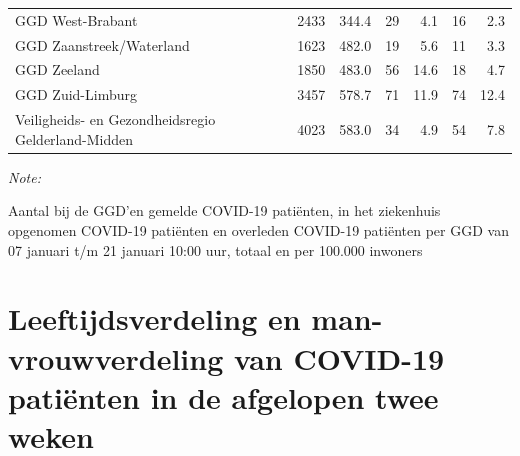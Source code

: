 \documentclass[
  english,
  man,floatsintext]{apa6}
\begin{document}
\begin{table}[H]
\begin{threeparttable}
\begin{tabular}{lrrrrrr}
GGD West-Brabant & 2433 & 344.4 & 29 & 4.1 & 16 & 2.3\\
GGD Zaanstreek/Waterland & 1623 & 482.0 & 19 & 5.6 & 11 & 3.3\\
GGD Zeeland & 1850 & 483.0 & 56 & 14.6 & 18 & 4.7\\
GGD Zuid-Limburg & 3457 & 578.7 & 71 & 11.9 & 74 & 12.4\\
Veiligheids- en Gezondheidsregio Gelderland-Midden & 4023 & 583.0 & 34 & 4.9 & 54 & 7.8\\
\bottomrule
\end{tabular}
\begin{tablenotes}
\item \textit{Note: } 
\item Aantal bij de GGD’en gemelde COVID-19 patiënten, in het ziekenhuis opgenomen COVID-19 patiënten en overleden COVID-19 patiënten per GGD van 07 januari t/m 21 januari 10:00 uur, totaal en per 100.000 inwoners
\end{tablenotes}
\end{threeparttable}
\endgroup{}
\end{table}

\newpage

\hypertarget{leeftijdsverdeling-en-man-vrouwverdeling-van-covid-19-patiuxebnten-in-de-afgelopen-twee-weken}{%
\section{Leeftijdsverdeling en man-vrouwverdeling van COVID-19 patiënten in de afgelopen twee weken}\label{leeftijdsverdeling-en-man-vrouwverdeling-van-covid-19-patiuxebnten-in-de-afgelopen-twee-weken}}
\end{document}
